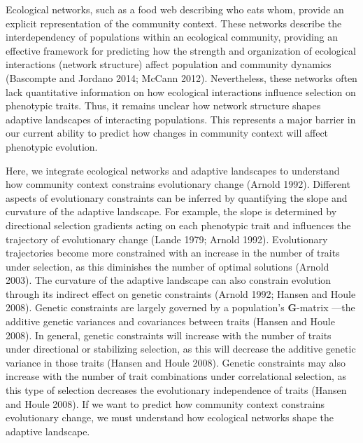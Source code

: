 \documentclass[11pt,]{article}
\begin{document}
Ecological networks, such as a food web describing who eats whom,
provide an explicit representation of the community context. These
networks describe the interdependency of populations within an
ecological community, providing an effective framework for predicting
how the strength and organization of ecological interactions (network
structure) affect population and community dynamics (Bascompte and
Jordano 2014; McCann 2012). Nevertheless, these networks often lack
quantitative information on how ecological interactions influence
selection on phenotypic traits. Thus, it remains unclear how network
structure shapes adaptive landscapes of interacting populations. This
represents a major barrier in our current ability to predict how changes
in community context will affect phenotypic evolution.

Here, we integrate ecological networks and adaptive landscapes to
understand how community context constrains evolutionary change (Arnold
1992). Different aspects of evolutionary constraints can be inferred by
quantifying the slope and curvature of the adaptive landscape. For
example, the slope is determined by directional selection gradients
acting on each phenotypic trait and influences the trajectory of
evolutionary change (Lande 1979; Arnold 1992). Evolutionary trajectories
become more constrained with an increase in the number of traits under
selection, as this diminishes the number of optimal solutions (Arnold
2003). The curvature of the adaptive landscape can also constrain
evolution through its indirect effect on genetic constraints (Arnold
1992; Hansen and Houle 2008). Genetic constraints are largely governed
by a population's \textbf{G}-matrix ---the additive genetic variances
and covariances between traits (Hansen and Houle 2008). In general,
genetic constraints will increase with the number of traits under
directional or stabilizing selection, as this will decrease the additive
genetic variance in those traits (Hansen and Houle 2008). Genetic
constraints may also increase with the number of trait combinations
under correlational selection, as this type of selection decreases the
evolutionary independence of traits (Hansen and Houle 2008). If we want
to predict how community context constrains evolutionary change, we must
understand how ecological networks shape the adaptive landscape.
\end{document}
